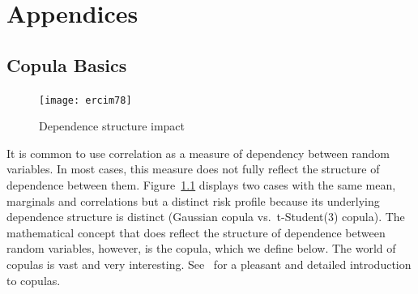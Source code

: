 \documentclass[11pt,fleqn]{book} %
\begin{document}

\appendix
{}
\chapter{Appendices}

\section{Copula Basics}
\label{ap:copula_basics}

\begin{figure}
	\vspace{-25pt}
	\begin{center}
		\texttt{[image: ercim78]}
	\end{center}
	\vspace{-10pt}
	\caption{Dependence structure impact}
	\vspace{-10pt}
	\label{fig:copula_impact}
\end{figure}
It is common to use correlation as a measure of dependency between random 
variables. In most cases, this measure does not fully reflect the structure 
of dependence between them. Figure~\ref{fig:copula_impact} displays two
cases with the same mean, marginals and correlations but a distinct risk
profile because its underlying  dependence structure is distinct (Gaussian 
copula vs.\ t-Student(3) copula). The mathematical concept that does reflect 
the structure of dependence between random variables, however, is the copula, 
which we define below. The world of copulas is vast and very interesting. 
See~\cite[chap. 5]{mcneil:2005} for a pleasant and detailed introduction to 
copulas.
\end{document}
